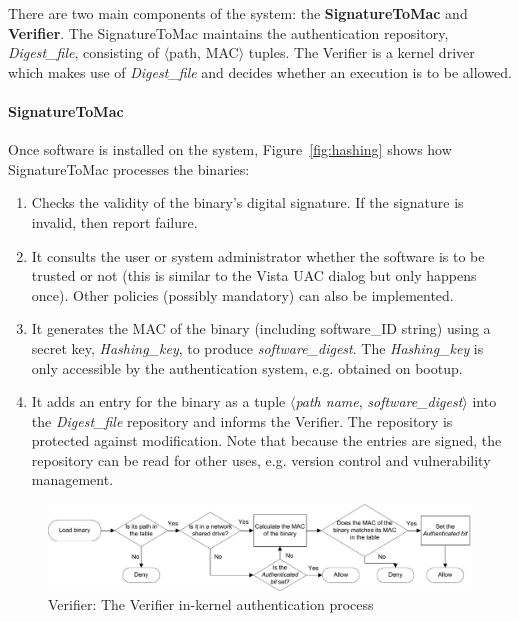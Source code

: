 There are two main components of the system: the {\bf SignatureToMac} and {\bf Verifier}.
The SignatureToMac maintains the authentication repository, {\it Digest\_file}, 
consisting of $\langle$path, MAC$\rangle$ tuples.
The Verifier is a kernel driver which makes use of
{\it Digest\_file} and
decides whether an execution is to be allowed.

\paragraph{SignatureToMac}

Once software is installed on the system,
Figure~\ref{fig:hashing} shows how SignatureToMac processes the binaries:
\begin{enumerate}
\item Checks the validity of the binary's digital signature.
If the signature is invalid, then report failure.
\item It consults the user or system administrator whether 
the software is to be trusted or not (this is similar to the Vista UAC 
dialog but only happens once).
Other policies (possibly mandatory) can also be implemented.
\item It generates the MAC of the binary 
(including software\_ID string) using a secret key, {\it Hashing\_key}, 
to produce {\it software\_digest}.
The {\it Hashing\_key} is only accessible
by the authentication system, e.g. obtained on bootup.
\item It adds an entry for the binary as a tuple $\langle${\it path name}, 
{\it software\_digest}$\rangle$ into the {\it Digest\_file} repository
and informs the Verifier.
The repository is protected against modification. Note that because the entries
are signed, the repository can be read for other uses, e.g.
version control and vulnerability management.
\end{enumerate}


\begin{figure}[tb]
\begin{center}
\includegraphics[width=1.0\textwidth]{binauth/verifier}
\caption{Verifier: The Verifier in-kernel authentication process}
\label{fig:verifier}
\end{center}
\end{figure}


